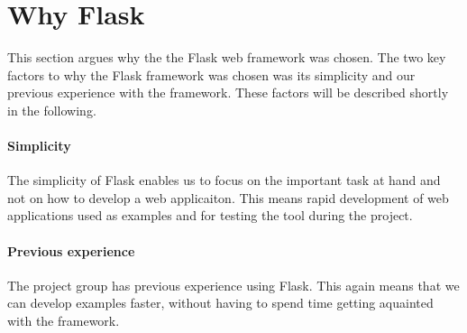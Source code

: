 \section{Why Flask}
This section argues why the the Flask web framework was chosen.
The two key factors to why the Flask framework was chosen was its simplicity and our previous experience with the framework.
These factors will be described shortly in the following.

\paragraph{Simplicity}
The simplicity of Flask enables us to focus on the important task at hand and not on how to develop a web applicaiton.
This means rapid development of web applications used as examples and for testing the tool during the project.

\paragraph{Previous experience}
The project group has previous experience using Flask.
This again means that we can develop examples faster, without having to spend time getting aquainted with the framework.

